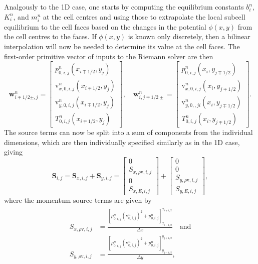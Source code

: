 Analgously to the 1D case, one starts by computing the equilibrium constants $b_i^n$, $K_i^n$, and $m_i^n$ at the cell centres and using those to extrapolate the local subcell equilibrium to the cell faces based on the changes in the potential $\phi(x,y)$ from the cell centres to the faces. If $\phi(x,y)$ is known only discretely, then a bilinear interpolation will now be needed to determine its value at the cell faces. The first-order primitive vector of inputs to the Riemann solver are then
\begin{equation} \label{eq:primitives2D1}
\mathbf{w}_{i\mp1/2\pm,j}^n=
\begin{bmatrix}
p_{0,i,j}^n(x_{i\mp1/2},y_j) \\ \mathrm{v}_{x,0,i,j}^n(x_{i\mp1/2},y_j) \\ \mathrm{v}_{y,0,i,j}^n(x_{i\mp1/2},y_j) \\ T_{0,i,j}^n(x_{i\mp1/2},y_j)
\end{bmatrix}
, \quad \mathbf{w}_{i,j\mp1/2\pm}^n=
\begin{bmatrix}
p_{0,i,j}^n(x_i,y_{j\mp1/2}) \\ \mathrm{v}_{x,0,i,j}^n(x_i,y_{j\mp1/2}) \\ \mathrm{v}_{y,0,,ji}^n(x_i,y_{j\mp1/2}) \\ T_{0,i,j}^n(x_i,y_{j\mp1/2})
\end{bmatrix}.
\end{equation}
The source terms can now be split into a sum of components from the individual dimensions, which are then individually specified similarly as in the 1D case, giving
\begin{equation}
\mathbf{S}_{i,j}=\mathbf{S}_{x,i,j}+\mathbf{S}_{y,i,j}=
\begin{bmatrix}
0 \\ S_{x,\rho \textrm{v},i,j} \\ 0 \\ S_{x,E,i,j}
\end{bmatrix} +
\begin{bmatrix}
0 \\ 0 \\ S_{y,\rho \textrm{v},i,j} \\ S_{y,E,i,j}
\end{bmatrix},
\end{equation}
where the momentum source terms are given by
\begin{align}
\begin{split}
S_{x,\rho \textrm{v},i,j}&=\frac{\left[\rho_{0,i,j}^n(\mathrm{v}_{0,i,j}^n)^2+p_{0,i,j}^n\right]_{x_{i-1/2}}^{x_{i+1/2}}}{\Delta x} \quad \textrm{and} \\
S_{y,\rho \textrm{v},i,j}&=\frac{\left[\rho_{0,i,j}^n(\mathrm{v}_{0,i,j}^n)^2+p_{0,i,j}^n\right]_{y_{j-1/2}}^{y_{j+1/2}}}{\Delta y},
\end{split}
\end{align}
